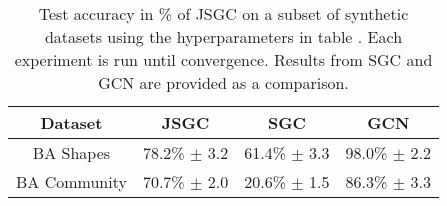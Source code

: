 \begin{table}
    \centering
    \begin{tabular}{c|c|cc}
        \textbf{Dataset} & \textbf{JSGC} & \textbf{SGC} & \textbf{GCN} \\
        \midrule
        BA Shapes       & 78.2\% $\pm$ 3.2 & 61.4\% $\pm$ 3.3 & 98.0\% $\pm$ 2.2 \\
        BA Community    & 70.7\% $\pm$ 2.0 & 20.6\% $\pm$ 1.5 & 86.3\% $\pm$ 3.3 \\
    \end{tabular}
    \caption{Test accuracy in \% of JSGC on a subset of synthetic datasets using the hyperparameters in table . Each experiment is run until convergence. Results from SGC and GCN are provided as a comparison.}
    \label{tab:JSGC-acc}
\end{table}

